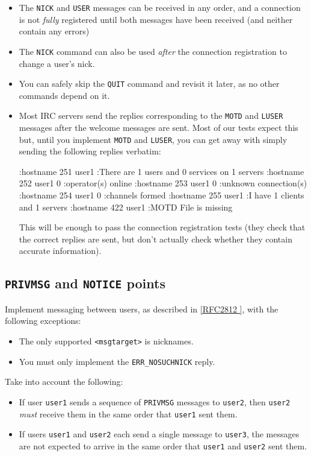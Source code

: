 \documentclass[10pt]{article}
\newcommand{\RFCsection}[2]{\href{http://tools.ietf.org/html/rfc#1\#section-#2}{[RFC#1 \textsection #2]}}
\newcommand{\points}[1]{{\sffamily\mdseries\guillemotleft #1 points\guillemotright{}}}
\newenvironment{example}%
{\VerbatimEnvironment\begin{Sbox}\begin{VerbExample}}%
{\end{VerbExample}\end{Sbox}\setlength{\fboxsep}{8pt}\begin{center}\fcolorbox{black}{backgroundgray}{\TheSbox}\end{center}}
\begin{document}
\begin{itemize}
\item The \texttt{NICK} and \texttt{USER} messages can be received in any order, and a connection is not \emph{fully} registered until both messages have been received (and neither contain any errors)
\item The \texttt{NICK} command can also be used \emph{after} the connection registration to change a user's nick.
\item You can safely skip the \texttt{QUIT} command and revisit it later, as no other commands depend on it.
\item Most IRC servers send the replies corresponding to the \texttt{MOTD} and \texttt{LUSER} messages after the welcome messages are sent. Most of our tests expect this but, until you implement \texttt{MOTD} and \texttt{LUSER}, you can get away with simply sending the following replies verbatim:

\begin{example}
:hostname 251 user1 :There are 1 users and 0 services on 1 servers
:hostname 252 user1 0 :operator(s) online
:hostname 253 user1 0 :unknown connection(s)
:hostname 254 user1 0 :channels formed
:hostname 255 user1 :I have 1 clients and 1 servers
:hostname 422 user1 :MOTD File is missing
\end{example}

This will be enough to pass the connection registration tests (they check that the correct replies are sent, but don't actually check whether they contain accurate information).

\end{itemize}

\subsection{\texttt{PRIVMSG} and \texttt{NOTICE} \points{30}}

Implement messaging between users, as described in \RFCsection{2812}{3.3}, with the following exceptions:

\begin{itemize}
\item The only supported \texttt{<msgtarget>} is nicknames.
\item You must only implement the \texttt{ERR\_NOSUCHNICK} reply.
\end{itemize}

\noindent Take into account the following:

\begin{itemize}
\item If user \texttt{user1} sends a sequence of \texttt{PRIVMSG} messages to \texttt{user2}, then \texttt{user2} \emph{must} receive them in the same order that \texttt{user1} sent them.
\item If users \texttt{user1} and \texttt{user2} each send a single message to \texttt{user3}, the messages are not expected to arrive in the same order that \texttt{user1} and \texttt{user2} sent them. 
\end{itemize}
\end{document}
